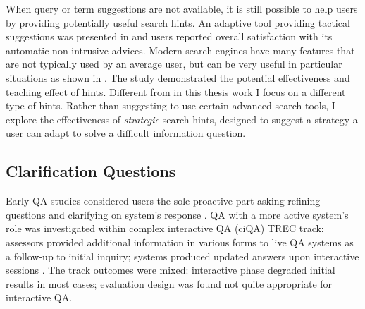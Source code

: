 When query or term suggestions are not available, it is still possible to help users by providing potentially useful search hints.
An adaptive tool providing tactical suggestions was presented in \cite{Kriewel2010} and users reported overall satisfaction with its automatic non-intrusive advices.
Modern search engines have many features that are not typically used by an average user, but can be very useful in particular situations as shown in \cite{Moraveji:2011:MIU:2009916.2009966}. The study demonstrated the potential effectiveness and teaching effect of hints.
Different from \cite{Moraveji:2011:MIU:2009916.2009966} in this thesis work I focus on a different type of hints.
Rather than suggesting to use certain advanced search tools, I explore the effectiveness of \textit{strategic} search hints, designed to suggest a strategy a user can adapt to solve a difficult information question.


\subsection{Clarification Questions}
\label{sec:rel_work:user:clarifictions}


Early QA studies considered users the sole proactive part asking refining questions and clarifying on system's response \cite{deboni2005}.
QA with a more active system's role was investigated within complex interactive QA (ciQA) TREC track: assessors provided additional information in various forms to live QA systems as a follow-up to initial inquiry; systems produced updated answers upon interactive sessions \cite{trec2007}.
The track outcomes were mixed: interactive phase degraded initial results in most cases; evaluation design was found not quite appropriate for interactive QA.


